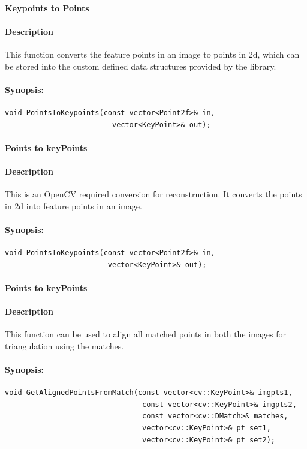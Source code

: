\paragraph{Keypoints to Points}
\paragraph{Description}
This function converts the feature points in an image to points in 2d, which can be stored into the custom defined data structures provided by the library.
\paragraph{Synopsis:}
\begin{lstlisting}
void PointsToKeypoints(const vector<Point2f>& in, 
			             vector<KeyPoint>& out);
\end{lstlisting}


\paragraph{Points to keyPoints}
\paragraph{Description}
 This is an OpenCV required conversion for reconstruction. It converts the points in 2d into feature points in an image. 
\paragraph{Synopsis:}
\begin{lstlisting}
void PointsToKeypoints(const vector<Point2f>& in, 
						vector<KeyPoint>& out);
\end{lstlisting}




\paragraph{Points to keyPoints}
\paragraph{Description}
 This function can be used to align all matched points in both the images for triangulation using the matches. 
\paragraph{Synopsis:}
\begin{lstlisting}
void GetAlignedPointsFromMatch(const vector<cv::KeyPoint>& imgpts1,
                                const vector<cv::KeyPoint>& imgpts2,
                                const vector<cv::DMatch>& matches,
                                vector<cv::KeyPoint>& pt_set1,
                                vector<cv::KeyPoint>& pt_set2);
\end{lstlisting}






